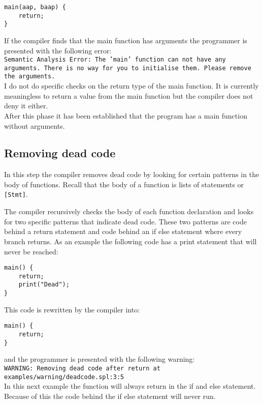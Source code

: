 \documentclass{report}
\begin{document}
\begin{lstlisting}[style=SPL]
main(aap, baap) {
    return;
}
\end{lstlisting}
If the compiler finds that the main function has arguments the programmer is presented with the following error:
\vspace{.1cm}\\
\noindent\small\texttt{\textcolor{error}{Semantic Analysis Error: The '\textcolor{name}{main}' function can not have any arguments.}
There is no way for you to initialise them. Please remove the arguments.}
\vspace{.1cm}\\
I do not do specific checks on the return type of the main function. It is currently meaningless to return a value from the main function but the compiler does not deny it either.
\\After this phase it has been established that the program has a main function without arguments.

\subsection{Removing dead code} \label{sec:Removing-dead-code}

In this step the compiler removes dead code by looking for certain patterns in the body of functions. 
Recall that the body of a function is lists of statements or \texttt{[Stmt]}.

The compiler recursively checks the body of each function declaration and looks for two specific patterns that indicate dead code. These two patterns are code behind a return statement and code behind an if else statement where every branch returns. As an example the following code has a print statement that will never be reached:

\begin{lstlisting}[style=SPL]
main() {
    return;
    print("Dead");
}
\end{lstlisting}

\noindent This code is rewritten by the compiler into:

\begin{lstlisting}[style=SPL]
main() {
    return;
}
\end{lstlisting}

\noindent and the programmer is presented with the following warning:\\
\noindent\small\texttt{\textcolor{warning}{WARNING:} Removing dead code after return at \textcolor{filename}{examples/warning/deadcode.spl:3:5}}
\\ 
In this next example the function will always return in the if and else statement.
Because of this the code behind the if else statement will never run.
\end{document}
